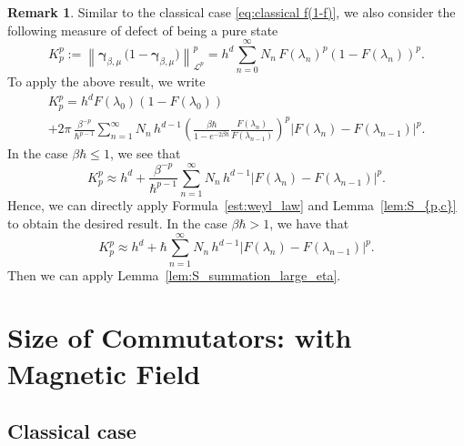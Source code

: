 \documentclass[11pt]{amsart}
\theoremstyle{plain}
\theoremstyle{definition}
\newtheorem{remark}[theorem]{Remark}
\newcommand		{\cL}		{\mathcal L}		%
\newcommand		{\lt}			{\left}				%
\newcommand		{\rt}			{\right}			%
\renewcommand	{\(}			{\lt(}
\renewcommand	{\)}			{\rt)}
\newcommand		{\n}[1]			{\lt\lvert #1 \rt\rvert}
\newcommand		{\nrm}[1]		{\lt\lVert #1\rt\rVert}
\newcommand		{\Nrm}[2]		{\nrm{#1}_{#2}}
\newcommand		{\opgam}	{{\boldsymbol{\gamma}}}	%
\begin{document}
	
	\begin{remark}
	    Similar to the classical case \eqref{eq:classical f(1-f)}, we also consider the following measure of defect of being a pure state 
	\begin{equation*}
		K_p^p := \Nrm{\opgam_{\beta,\mu} \,\bigl(1-\opgam_{\beta,\mu}\bigr)}{\cL^p}^p = h^d\sum_{n=0}^\infty N_n \, F(\lambda_n)^p \lt(1-F(\lambda_n)\rt)^p .
	\end{equation*} 
	To apply the above result, we write 
	\begin{multline*}
		K_p^p = h^d F(\lambda_0) \lt(1-F(\lambda_0)\rt)
		\\
		+ 2\pi\,\frac{\beta^{-p}}{\hbar^{p-1}}\sum_{n=1}^\infty N_n \, h^{d-1} \lt(\frac{\beta\hbar}{1-e^{-2\beta\hbar}}\frac{F(\lambda_{n})}{F(\lambda_{n-1})}\rt)^p \n{F(\lambda_n)-F(\lambda_{n-1})}^p .
	\end{multline*}
	In the case $\beta\hbar \le 1$, we see that
	\begin{equation*}
		K_p^p\approx h^d+\frac{\beta^{-p}}{\hbar^{p-1}}\sum_{n=1}^\infty N_n\,h^{d-1}\n{F(\lambda_n)-F(\lambda_{n-1})}^p .
	\end{equation*}
	Hence, we can directly apply Formula~\eqref{est:weyl_law} and Lemma~\ref{lem:S_{p,c}} to obtain the desired result. In the case $\beta\hbar > 1$, we have that 
    \begin{equation*}
		K_p^p\approx h^d+\hbar\sum_{n=1}^\infty N_n\,h^{d-1}\n{F(\lambda_n)-F(\lambda_{n-1})}^p .
	\end{equation*}
    Then we can apply Lemma~\ref{lem:S_summation_large_eta}.
	\end{remark}
	

\section{Size of Commutators: with Magnetic Field}\label{sec:withMagnet}

\subsection{Classical case}\label{sec:withMagnet-classic}
\end{document}
